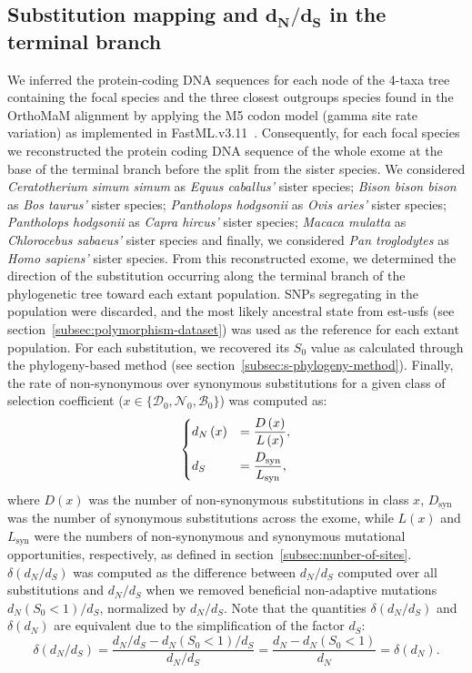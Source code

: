\documentclass[10pt,letterpaper]{article}
\newcommand{\dn}{d_N}
\newcommand{\ds}{d_S}
\newcommand{\dnds}{\dn / \ds}
\newcommand{\Sphy}{S_{0}}
\newcommand{\SphyDel}{\mathcal{D}_0}
\newcommand{\SphyNeu}{\mathcal{N}_0}
\newcommand{\SphyBen}{\mathcal{B}_0}
\newcommand{\Sphyclass}{x}
\begin{document}
\subsection{Substitution mapping and \texorpdfstring{$\bm{\dnds}$}{dₙ/dₛ} in the terminal branch}
\label{subsec:substitution-mapping-in-the-terminal-branch}
We inferred the protein-coding DNA sequences for each node of the 4-taxa tree containing the focal species and the three closest outgroups species found in the OrthoMaM alignment by applying the M5 codon model (gamma site rate variation) as implemented in FastML.v3.11~\cite{ashkenazy_fastml_2012}.
Consequently, for each focal species we reconstructed the protein coding DNA sequence of the whole exome at the base of the terminal branch before the split from the sister species.
We considered \textit{Ceratotherium simum simum} as \textit{Equus caballus'} sister species; \textit{Bison bison bison} as \textit{Bos taurus'} sister species; \textit{Pantholops hodgsonii} as \textit{Ovis aries'} sister species; \textit{Pantholops hodgsonii} as \textit{Capra hircus'} sister species; \textit{Macaca mulatta} as \textit{Chlorocebus sabaeus'} sister species and finally, we considered \textit{Pan troglodytes} as \textit{Homo sapiens'} sister species.
From this reconstructed exome, we determined the direction of the substitution occurring along the terminal branch of the phylogenetic tree toward each extant population.
SNPs segregating in the population were discarded, and the most likely ancestral state from est-usfs (see section~\ref{subsec:polymorphism-dataset}) was used as the reference for each extant population.
For each substitution, we recovered its $\Sphy$ value as calculated through the phylogeny-based method (see section~\ref{subsec:s-phylogeny-method}).
Finally, the rate of non-synonymous over synonymous substitutions for a given class of selection coefficient ($\Sphyclass \in \{\SphyDel, \SphyNeu, \SphyBen \}$) was computed as:
\begin{align}
\begin{dcases}
\dn \left( \Sphyclass \right) &= \dfrac{D\left( \Sphyclass \right)}{L \left( \Sphyclass \right)}, \\
\ds &= \dfrac{D_{\text{syn}}}{L_{\text{syn}}},
\end{dcases}\label{eq:dnds}
\end{align}
where $D \left( \Sphyclass \right) $ was the number of non-synonymous substitutions in class $\Sphyclass$, $D_{\text{syn}}$ was the number of synonymous substitutions across the exome, while $L \left( \Sphyclass \right)$ and $L_{\text{syn}}$ were the numbers of non-synonymous and synonymous mutational opportunities, respectively, as defined in section~\ref{subsec:nunber-of-sites}.
$\delta(\dnds)$ was computed as the difference between $\dnds$ computed over all substitutions and $\dnds$ when we removed beneficial non-adaptive mutations $\dn (\Sphy < 1) / \ds$, normalized by $\dnds$.
Note that the quantities $\delta(\dnds)$ and $\delta(\dn)$ are equivalent due to the simplification of the factor $\ds$:
\begin{equation}
\delta(\dnds) = \dfrac{\dnds - \dn(\Sphy < 1) / \ds}{\dnds} = \dfrac{\dn - \dn(\Sphy < 1)}{\dn} = \delta(\dn).\label{eq:delta-dnds}
\end{equation}
\end{document}
